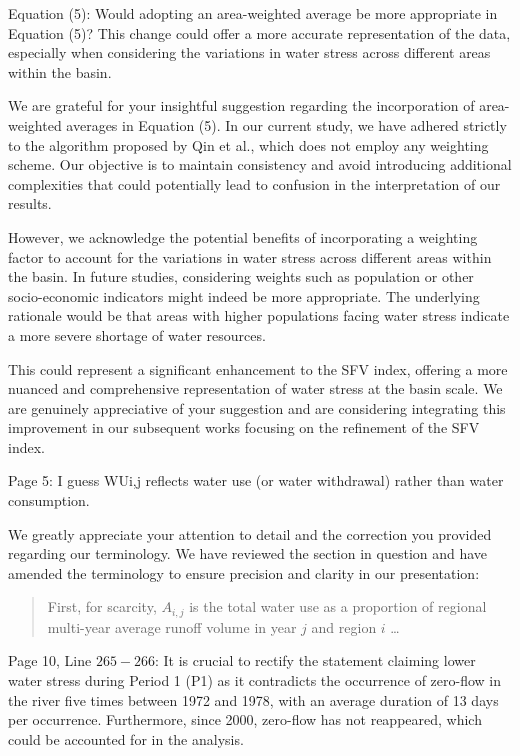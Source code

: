 \RC{} Equation (5): Would adopting an area-weighted average be more appropriate in Equation (5)? This change could offer a more accurate representation of the data, especially when considering the variations in water stress across different areas within the basin.

\AR{} We are grateful for your insightful suggestion regarding the incorporation of area-weighted averages in Equation (5). In our current study, we have adhered strictly to the algorithm proposed by Qin et al., which does not employ any weighting scheme. Our objective is to maintain consistency and avoid introducing additional complexities that could potentially lead to confusion in the interpretation of our results.

\AR*{} However, we acknowledge the potential benefits of incorporating a weighting factor to account for the variations in water stress across different areas within the basin. In future studies, considering weights such as population or other socio-economic indicators might indeed be more appropriate. The underlying rationale would be that areas with higher populations facing water stress indicate a more severe shortage of water resources.

\AR*{} This could represent a significant enhancement to the SFV index, offering a more nuanced and comprehensive representation of water stress at the basin scale. We are genuinely appreciative of your suggestion and are considering integrating this improvement in our subsequent works focusing on the refinement of the SFV index.

\RC{} Page 5: I guess WUi,j reflects water use (or water withdrawal) rather than water consumption.

\AR{} We greatly appreciate your attention to detail and the correction you provided regarding our terminology. We have reviewed the section in question and have amended the terminology to ensure precision and clarity in our presentation:

\begin{quote}
	First, for scarcity, $A_{i, j}$ is the total water use as a proportion of regional multi-year average runoff volume in year $j$ and region $i$ \dots
\end{quote}

\RC{} Page 10, Line $265-266$: It is crucial to rectify the statement claiming lower water stress during Period 1 (P1) as it contradicts the occurrence of zero-flow in the river five times between 1972 and 1978, with an average duration of 13 days per occurrence. Furthermore, since 2000, zero-flow has not reappeared, which could be accounted for in the analysis.

